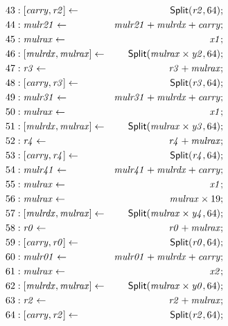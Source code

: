 {\begin{multicols}{2}
\begin{align*}
43 &: \concat{\mathit{carry}}{\mathit{r2}} \leftarrow & \dslcode{Split}(\mathit{r2}, 64); \\
44 &: \mathit{mulr21} \leftarrow & \mathit{mulr21} + \mathit{mulrdx} + \mathit{carry}; \\
45 &: \mathit{mulrax} \leftarrow & \mathit{x1}; \\
46 &: \concat{\mathit{mulrdx}}{\mathit{mulrax}} \leftarrow & \dslcode{Split}(\mathit{mulrax} \times \mathit{y2}, 64); \\
47 &: \mathit{r3} \leftarrow & \mathit{r3} + \mathit{mulrax}; \\
48 &: \concat{\mathit{carry}}{\mathit{r3}} \leftarrow & \dslcode{Split}(\mathit{r3}, 64); \\
49 &: \mathit{mulr31} \leftarrow & \mathit{mulr31} + \mathit{mulrdx} + \mathit{carry}; \\
50 &: \mathit{mulrax} \leftarrow & \mathit{x1}; \\
51 &: \concat{\mathit{mulrdx}}{\mathit{mulrax}} \leftarrow & \dslcode{Split}(\mathit{mulrax} \times \mathit{y3}, 64); \\
52 &: \mathit{r4} \leftarrow & \mathit{r4} + \mathit{mulrax}; \\
53 &: \concat{\mathit{carry}}{\mathit{r4}} \leftarrow & \dslcode{Split}(\mathit{r4}, 64); \\
54 &: \mathit{mulr41} \leftarrow & \mathit{mulr41} + \mathit{mulrdx} + \mathit{carry}; \\
55 &: \mathit{mulrax} \leftarrow & \mathit{x1}; \\
56 &: \mathit{mulrax} \leftarrow & \mathit{mulrax} \times 19; \\
57 &: \concat{\mathit{mulrdx}}{\mathit{mulrax}} \leftarrow & \dslcode{Split}(\mathit{mulrax} \times \mathit{y4}, 64); \\
58 &: \mathit{r0} \leftarrow & \mathit{r0} + \mathit{mulrax}; \\
59 &: \concat{\mathit{carry}}{\mathit{r0}} \leftarrow & \dslcode{Split}(\mathit{r0}, 64); \\
60 &: \mathit{mulr01} \leftarrow & \mathit{mulr01} + \mathit{mulrdx} + \mathit{carry}; \\
61 &: \mathit{mulrax} \leftarrow & \mathit{x2}; \\
62 &: \concat{\mathit{mulrdx}}{\mathit{mulrax}} \leftarrow & \dslcode{Split}(\mathit{mulrax} \times \mathit{y0}, 64); \\
63 &: \mathit{r2} \leftarrow & \mathit{r2} + \mathit{mulrax}; \\
64 &: \concat{\mathit{carry}}{\mathit{r2}} \leftarrow & \dslcode{Split}(\mathit{r2}, 64); \\

\end{align*}
\end{multicols}}
